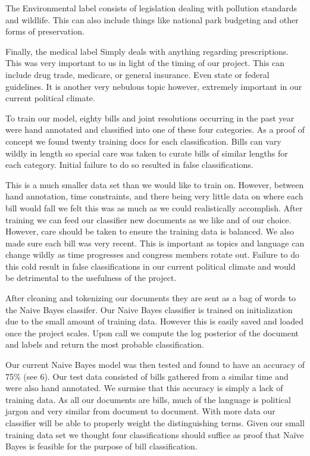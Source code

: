 \documentclass[11pt,a4paper]{article}
\begin{document}
The Environmental label consists of legislation dealing with pollution standards and wildlife. This can also include things like national park budgeting and other forms of preservation. 

Finally, the medical label Simply deals with anything regarding prescriptions. This was very important to us in light of the timing of our project. This can include drug trade, medicare, or general insurance. Even state or federal guidelines. It is another very nebulous topic however, extremely important in our current political climate. 

To train our model, eighty bills and joint resolutions occurring in the past year were hand annotated and classified into one of these four categories. As a proof of concept we found twenty training docs for each classification. Bills can vary wildly in length so special care was taken to curate bills of similar lengths for each category. Initial failure to do so resulted in false classifications. 

This is a much smaller data set than we would like to train on. However, between hand annotation, time constraints, and there being very little data on where each bill would fall we felt this was as much as we could realistically accomplish. After training we can feed our classifier new documents as we like and of our choice. However, care should be taken to ensure the training data is balanced. We also made sure each bill was very recent. This is important as topics and language can change wildly as time progresses and congress members rotate out. Failure to do this cold result in false classifications in our current political climate and would be detrimental to the usefulness of the project. 

After cleaning and tokenizing our documents they are sent as a bag of words to the Naive Bayes classifer. Our Naive Bayes classifier is trained on initialization due to the small amount of training data. However this is easily saved and loaded once the project scales. Upon call we compute the log posterior of the document and labels and return the most probable classification. 

Our current Naive Bayes model was then tested and found to have an accuracy of 75\% (see 6). Our test data consisted of bills gathered from a similar time and were also hand annotated. We surmise that this accuracy is simply a lack of training data. As all our documents are bills, much of the language is political jargon and very similar from document to document. With more data our classifier will be able to properly weight the distinguishing terms. Given our small training data set we thought four classifications should suffice as proof that Naïve Bayes is feasible for the purpose of bill classification.
\end{document}
